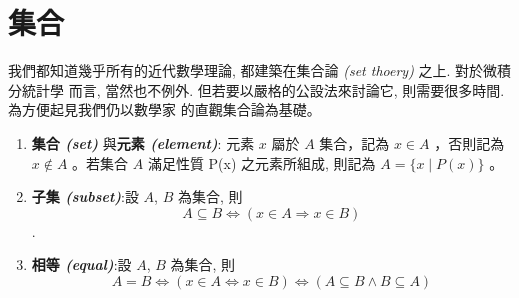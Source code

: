 	\section{集合 {}}
	我們都知道幾乎所有的近代數學理論, 都建築在集合論 \emph{(set thoery)} 之上. 對於微積分統計學
而言, 當然也不例外. 但若要以嚴格的公設法來討論它, 則需要很多時間. 為方便起見我們仍以數學家
\underline {} 的直觀集合論為基礎。
		\begin{enumerate}
		\item {\textbf{集合 \emph{(set)}} 與\textbf{元素 \emph{(element)}}:
元素 $x$ 屬於 $A$ 集合，記為 $x \in A$ ，否則記為 $x \notin A$ 。若集合 $A$ 滿足性質 P(x) 之元素所組成, 則記為 $A = \{x \mid P(x)\}$ 。		
		}		
		\item {\textbf{子集   \emph{(subset)}}:設 $A$, $B$ 為集合, 則		
		$$A \subseteq B \Leftrightarrow (x \in A \Rightarrow x \in B)$$.
		 }
		 \item {\textbf{相等   \emph{(equal)}}:設 $A$, $B$ 為集合, 則	
		 $$A=B \Leftrightarrow (x \in A \Leftrightarrow x \in B) \Leftrightarrow (A \subseteq B \wedge B \subseteq A)$$
		 }
		 

\end{enumerate}
